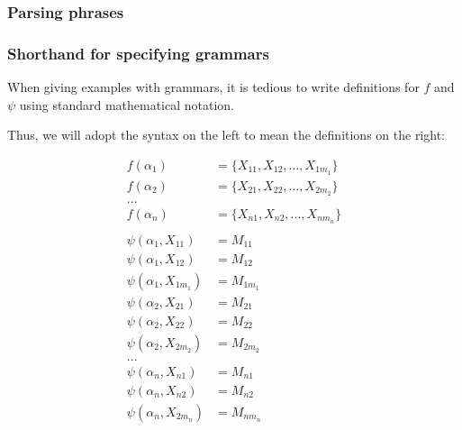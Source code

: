 \documentclass[main.tex]{subfiles}
\begin{document}
\subsubsection{Parsing phrases}
\subsubsection{Shorthand for specifying grammars}
\label{shorthand}
When giving examples with grammars, it is tedious to write definitions
for $f$ and $\psi$ using standard mathematical notation.

Thus, we will adopt the syntax on the left to mean the definitions on the right:
\begin{center}
    \begin{minipage}{.4\textwidth}
    \end{minipage}
    \hspace{.15\textwidth}
    \begin{minipage}{.4\textwidth}
        \begin{align*}
            f(\alpha_1) &= \{ X_{11}, X_{12}, ..., X_{1m_1} \} \\
            f(\alpha_2) &= \{ X_{21}, X_{22}, ..., X_{2m_2} \} \\
            ...& \\
            f(\alpha_n) &= \{ X_{n1}, X_{n2}, ..., X_{nm_n} \} \\
            \\
            \psi(\alpha_1, X_{11}) &= M_{11} \\
            \psi(\alpha_1, X_{12}) &= M_{12} \\
            \psi(\alpha_1, X_{1m_1}) &= M_{1m_1} \\
            \psi(\alpha_2, X_{21}) &= M_{21} \\
            \psi(\alpha_2, X_{22}) &= M_{22} \\
            \psi(\alpha_2, X_{2m_2}) &= M_{2m_2} \\
            ...& \\
            \psi(\alpha_n, X_{n1}) &= M_{n1} \\
            \psi(\alpha_n, X_{n2}) &= M_{n2} \\
            \psi(\alpha_n, X_{2m_n}) &= M_{nm_n} \\
        \end{align*}
    \end{minipage}
\end{center}
\end{document}
